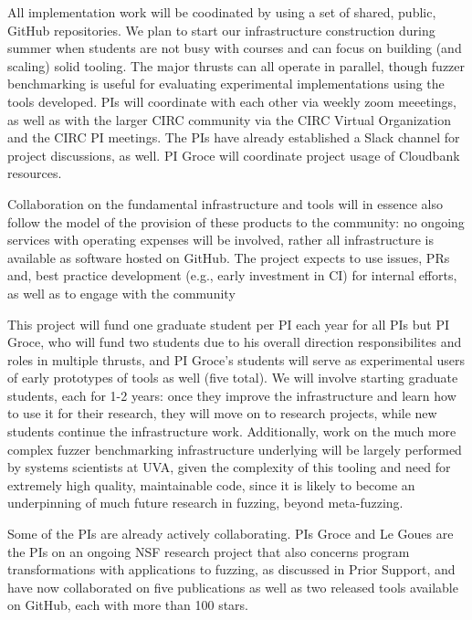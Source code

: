 All implementation work will be coodinated by using a set of shared, public, 
GitHub repositories.    We plan to start our
infrastructure construction during summer when students are
not busy with courses and can focus on
building (and scaling) solid tooling.  The major thrusts can all operate in 
parallel, though fuzzer benchmarking is useful for evaluating experimental 
implementations using the tools developed.  PIs will coordinate with
each other via
weekly zoom meeetings, as well as with the larger CIRC community via the
CIRC Virtual Organization and the CIRC PI meetings.  The PIs have
already established a Slack channel for project discussions, as well.
PI Groce will coordinate project usage of Cloudbank resources.

Collaboration on the fundamental infrastructure and tools will in
essence also follow the model of the provision of these products to
the community: no ongoing services with operating expenses will be
involved, rather all infrastructure is available as software hosted on
GitHub.  The project expects to use issues, PRs and, best practice
development (e.g., early investment in CI)
for internal efforts, as well as to engage with the community


This project will fund one graduate student per PI each year for all
PIs but PI Groce, who will fund two students due to his overall
direction responsibilites and roles in multiple thrusts, and PI
Groce's students will serve as experimental users of early prototypes
of tools as well
(five total).  We will
involve starting graduate students, each for 1-2 years: once they
improve the infrastructure and learn how to use it for their research,
they will move on to research projects, while new
students continue the infrastructure work.  Additionally, work on the much more 
complex fuzzer benchmarking infrastructure underlying will be largely performed 
by systems scientists at UVA, given the complexity of this tooling and need for 
extremely high quality, maintainable code, since it is likely to become an 
underpinning of much future research in fuzzing, beyond meta-fuzzing.


Some of the PIs are already actively collaborating.
PIs Groce and Le Goues are the PIs on an ongoing NSF research project
that also concerns program transformations with applications to
fuzzing, as discussed in Prior Support, and have now collaborated on
five publications as well as two released tools available on GitHub,
each with more than 100 stars.  

